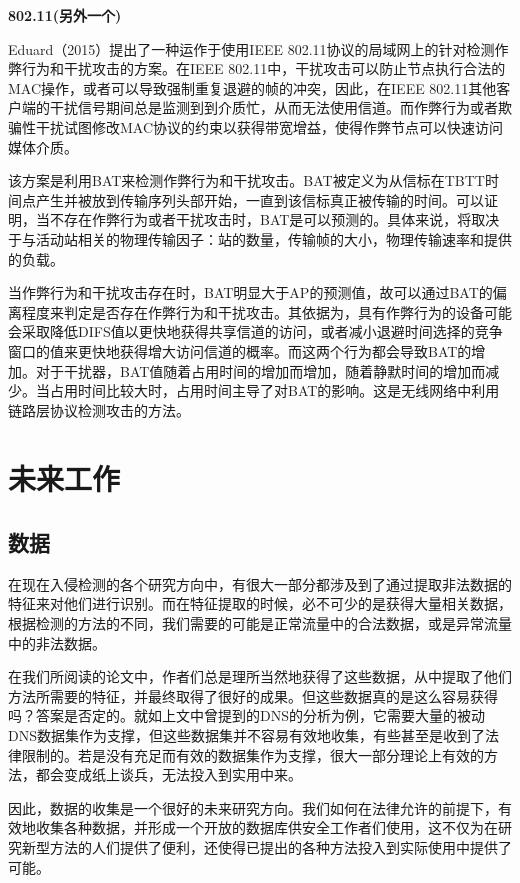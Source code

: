 \documentclass[12pt]{article} %
\begin{document}
\textbf{802.11(另外一个)}

Eduard（2015）提出了一种运作于使用IEEE 802.11协议的局域网上的针对检测作弊行为和干扰攻击的方案。在IEEE 802.11中，干扰攻击可以防止节点执行合法的MAC操作，或者可以导致强制重复退避的帧的冲突，因此，在IEEE 802.11其他客户端的干扰信号期间总是监测到到介质忙，从而无法使用信道。而作弊行为或者欺骗性干扰试图修改MAC协议的约束以获得带宽增益，使得作弊节点可以快速访问媒体介质。

该方案是利用BAT来检测作弊行为和干扰攻击。BAT被定义为从信标在TBTT时间点产生并被放到传输序列头部开始，一直到该信标真正被传输的时间。可以证明，当不存在作弊行为或者干扰攻击时，BAT是可以预测的。具体来说，将取决于与活动站相关的物理传输因子：站的数量，传输帧的大小，物理传输速率和提供的负载。

当作弊行为和干扰攻击存在时，BAT明显大于AP的预测值，故可以通过BAT的偏离程度来判定是否存在作弊行为和干扰攻击。其依据为，具有作弊行为的设备可能会采取降低DIFS值以更快地获得共享信道的访问，或者减小退避时间选择的竞争窗口的值来更快地获得增大访问信道的概率。而这两个行为都会导致BAT的增加。对于干扰器，BAT值随着占用时间的增加而增加，随着静默时间的增加而减少。当占用时间比较大时，占用时间主导了对BAT的影响。这是无线网络中利用链路层协议检测攻击的方法。

\section{未来工作}
\label{future}

\subsection{数据}
\label{data}

在现在入侵检测的各个研究方向中，有很大一部分都涉及到了通过提取非法数据的特征来对他们进行识别。而在特征提取的时候，必不可少的是获得大量相关数据，根据检测的方法的不同，我们需要的可能是正常流量中的合法数据，或是异常流量中的非法数据。

在我们所阅读的论文中，作者们总是理所当然地获得了这些数据，从中提取了他们方法所需要的特征，并最终取得了很好的成果。但这些数据真的是这么容易获得吗？答案是否定的。就如上文中曾提到的DNS的分析为例，它需要大量的被动DNS数据集作为支撑，但这些数据集并不容易有效地收集，有些甚至是收到了法律限制的。若是没有充足而有效的数据集作为支撑，很大一部分理论上有效的方法，都会变成纸上谈兵，无法投入到实用中来。

因此，数据的收集是一个很好的未来研究方向。我们如何在法律允许的前提下，有效地收集各种数据，并形成一个开放的数据库供安全工作者们使用，这不仅为在研究新型方法的人们提供了便利，还使得已提出的各种方法投入到实际使用中提供了可能。
\end{document}
